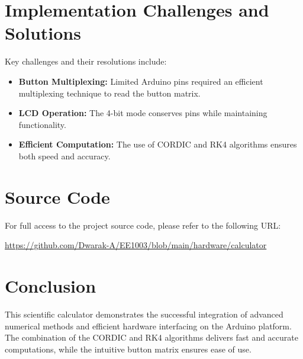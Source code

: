 \documentclass[a4paper,12pt]{article}
\begin{document}
\section{Implementation Challenges and Solutions}
Key challenges and their resolutions include:
\begin{itemize}
    \item \textbf{Button Multiplexing:} Limited Arduino pins required an efficient multiplexing technique to read the button matrix.
    \item \textbf{LCD Operation:} The 4-bit mode conserves pins while maintaining functionality.
    \item \textbf{Efficient Computation:} The use of CORDIC and RK4 algorithms ensures both speed and accuracy.
\end{itemize}

\section{Source Code}
For full access to the project source code, please refer to the following URL:
\begin{center}
\url{https://github.com/Dwarak-A/EE1003/blob/main/hardware/calculator}
\end{center}

\section{Conclusion}
This scientific calculator demonstrates the successful integration of advanced numerical methods and efficient hardware interfacing on the Arduino platform. The combination of the CORDIC and RK4 algorithms delivers fast and accurate computations, while the intuitive button matrix ensures ease of use.
\end{document}
